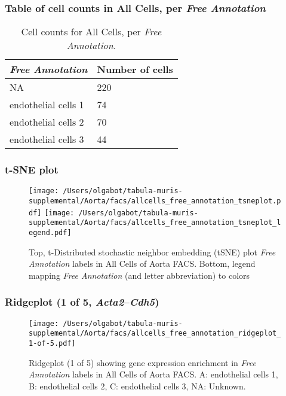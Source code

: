 \subsubsection{Table of cell counts in All Cells, per \emph{Free Annotation}}\begin{table}[h]
\centering
\label{my-label}
\begin{tabular}{@{}ll@{}}
\toprule

\emph{Free Annotation}& Number of cells \\ \midrule
NA & 220 \\

endothelial cells 1 & 74 \\

endothelial cells 2 & 70 \\

endothelial cells 3 & 44 \\
\bottomrule
\end{tabular}
\caption{Cell counts for All Cells, per \emph{Free Annotation}.}
\end{table}

\clearpage
\subsubsection{t-SNE plot}
\begin{figure}[h]
\centering
\texttt{[image: /Users/olgabot/tabula-muris-supplemental/Aorta/facs/allcells\_free\_annotation\_tsneplot.pdf]}
\texttt{[image: /Users/olgabot/tabula-muris-supplemental/Aorta/facs/allcells\_free\_annotation\_tsneplot\_legend.pdf]}
\caption{Top, t-Distributed stochastic neighbor embedding (tSNE) plot  \emph{Free Annotation} labels in All Cells of Aorta FACS. Bottom, legend mapping \emph{Free Annotation} (and letter abbreviation) to colors}
\end{figure}


\clearpage

\subsubsection{Ridgeplot (1 of 5, \emph{Acta2}--\emph{Cdh5})}
\begin{figure}[h]
\centering
\texttt{[image: /Users/olgabot/tabula-muris-supplemental/Aorta/facs/allcells\_free\_annotation\_ridgeplot\_1-of-5.pdf]}

\caption{ Ridgeplot (1 of 5)  showing gene expression enrichment in \emph{Free Annotation} labels in All Cells of Aorta FACS. A: endothelial cells 1, B: endothelial cells 2, C: endothelial cells 3, NA: Unknown.}
\end{figure}


